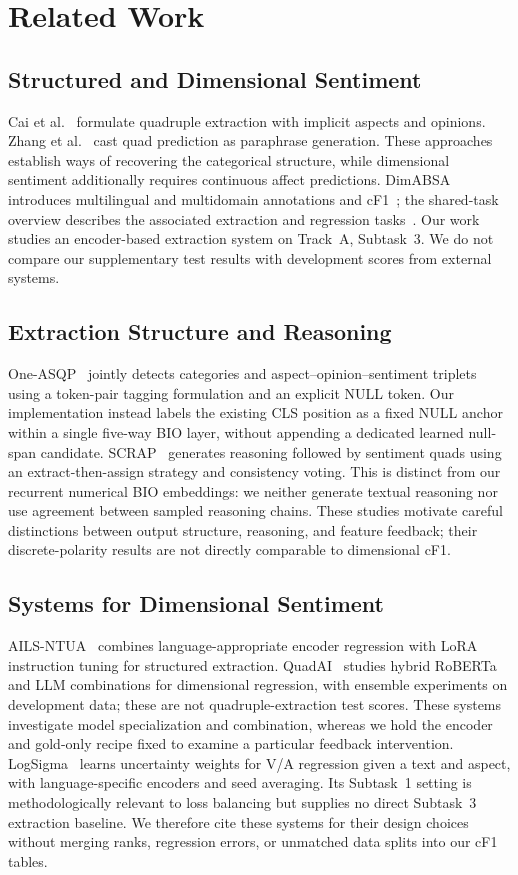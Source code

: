 \documentclass[conference]{IEEEtran}
\begin{document}
\section{Related Work}
\subsection{Structured and Dimensional Sentiment}
Cai et al.~\cite{cai2021acos} formulate quadruple extraction with implicit aspects and opinions. Zhang et al.~\cite{zhang2021asqp} cast quad prediction as paraphrase generation. These approaches establish ways of recovering the categorical structure, while dimensional sentiment additionally requires continuous affect predictions. DimABSA introduces multilingual and multidomain annotations and cF1~\cite{dimabsa2026}; the shared-task overview describes the associated extraction and regression tasks~\cite{overview2026}. Our work studies an encoder-based extraction system on Track~A, Subtask~3. We do not compare our supplementary test results with development scores from external systems.

\subsection{Extraction Structure and Reasoning}
One-ASQP~\cite{zhou2023one} jointly detects categories and aspect--opinion--sentiment triplets using a token-pair tagging formulation and an explicit NULL token. Our implementation instead labels the existing CLS position as a fixed NULL anchor within a single five-way BIO layer, without appending a dedicated learned null-span candidate. SCRAP~\cite{kim2024scrap} generates reasoning followed by sentiment quads using an extract-then-assign strategy and consistency voting. This is distinct from our recurrent numerical BIO embeddings: we neither generate textual reasoning nor use agreement between sampled reasoning chains. These studies motivate careful distinctions between output structure, reasoning, and feature feedback; their discrete-polarity results are not directly comparable to dimensional cF1.

\subsection{Systems for Dimensional Sentiment}
AILS-NTUA~\cite{gazetas2026ails} combines language-appropriate encoder regression with LoRA instruction tuning for structured extraction. QuadAI~\cite{devink2026quad} studies hybrid RoBERTa and LLM combinations for dimensional regression, with ensemble experiments on development data; these are not quadruple-extraction test scores. These systems investigate model specialization and combination, whereas we hold the encoder and gold-only recipe fixed to examine a particular feedback intervention. LogSigma~\cite{hikal2026logsigma} learns uncertainty weights for V/A regression given a text and aspect, with language-specific encoders and seed averaging. Its Subtask~1 setting is methodologically relevant to loss balancing but supplies no direct Subtask~3 extraction baseline. We therefore cite these systems for their design choices without merging ranks, regression errors, or unmatched data splits into our cF1 tables.
\end{document}
